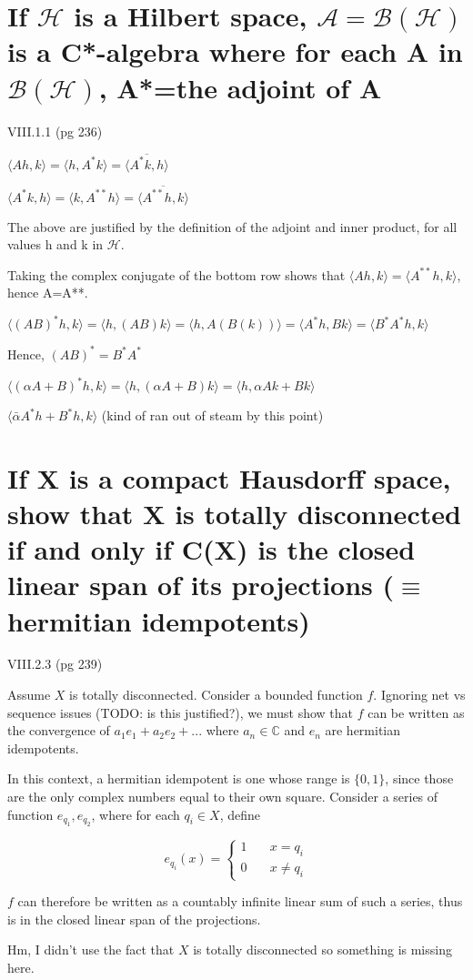 \documentclass{article}
\begin{document}
\section{If $\mathscr{H}$ is a Hilbert space, $\mathscr{A}=\mathscr{B}(\mathscr{H} )$ is a C*-algebra where for each A in $\mathscr{B}(\mathscr{H} )$, A*=the adjoint of A}

VIII.1.1 (pg 236)

$\langle Ah, k \rangle = \langle h, A^*k \rangle = \overline{ \langle A^*k,h \rangle}$

$\langle A^*k, h \rangle = \langle k, A^{**}h \rangle = \overline{\langle A^{**}h,k \rangle}$

The above are justified by the definition of the adjoint and inner product, for all values h and k in $\mathscr{H}$.

Taking the complex conjugate of the bottom row shows that $\langle Ah, k \rangle = \langle A^{**}h,k \rangle$, hence A=A**.

$\langle (AB)^*h, k \rangle = \langle h, (AB)k \rangle = \langle h, A(B(k)) \rangle = \langle A^* h, B k \rangle = \langle B^*A^*h,k \rangle$

Hence, $(AB)^* = B^*A^*$

$\langle (\alpha A + B)^*h,k \rangle = \langle h, (\alpha A + B) k \rangle = \langle h, \alpha A k + B k \rangle$

$\langle \bar{\alpha}A^*h+B^*h, k \rangle$ (kind of ran out of steam by this point)


\section{If X is a compact Hausdorff space, show that X is totally disconnected if and only if C(X) is the closed linear span of its projections ($\equiv$ hermitian idempotents)}

VIII.2.3 (pg 239)

Assume $X$ is totally disconnected. Consider a bounded function $f$. Ignoring net vs sequence issues (TODO: is this justified?), we must show that $f$ can be written as the convergence of $a_1 e_1 + a_2 e_2 + ... $ where $a_n \in \mathbb{C}$ and $e_n$ are hermitian idempotents.

In this context, a hermitian idempotent is one whose range is $\{0,1\}$, since those are the only complex numbers equal to their own square. Consider a series of function $e_{q_1}, e_{q_2}$, where for each ${q_i} \in X$, define

\begin{equation*}
e_{q_i}(x)= \left\{
        \begin{array}{ll}
            1 & \quad x = q_i \\
            0 & \quad x \ne q_i
        \end{array}
    \right.
\end{equation*}

$f$ can therefore be written as a countably infinite linear sum of such a series, thus is in the closed linear span of the projections.

Hm, I didn't use the fact that $X$ is totally disconnected so something is missing here.
\end{document}
